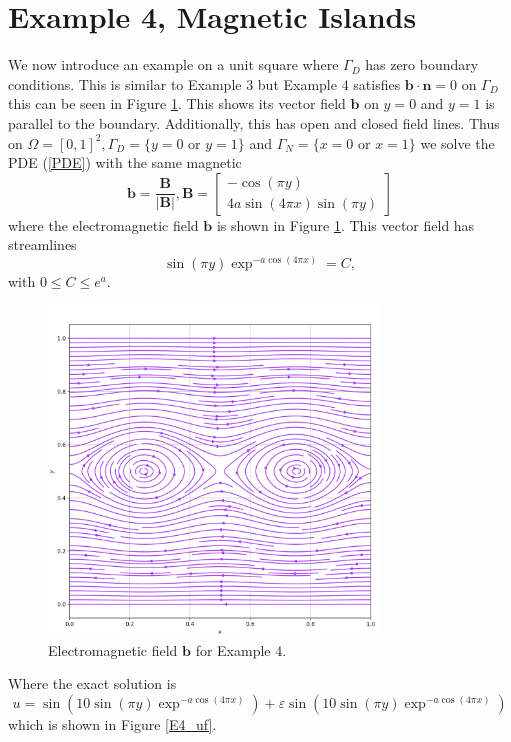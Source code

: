 \documentclass[12pt]{ociamthesis}
\begin{document}
\newpage
\section{Example 4, Magnetic Islands}

We now introduce an example on a unit square where $\Gamma_D$ has zero boundary conditions. This is similar to Example $3$ but Example $4$ satisfies $\mathbf{b}\cdot\mathbf{n} = 0$ on $\Gamma_D$ this can be seen in Figure \ref{E4_VF}. This shows its vector field $\mathbf{b}$ on $y=0$ and $y=1$ is parallel to the boundary. Additionally, this has open and closed field lines.
Thus on $\Omega = [0,1]^2, \Gamma_D = \{y=0 \text{ or } y=1\}$ and $\Gamma_N = \{x=0 \text{ or } x=1\}$ we solve the PDE (\ref{PDE}) with the same magnetic
\begin{equation}
\mathbf{b} = \frac{\mathbf{B}}{|\mathbf{B}|}, 
\mathbf{B} = \left[ \begin{matrix}
-\cos(\pi y)\\
4a \sin(4 \pi x) \sin(\pi y)
\end{matrix} \right]
\end{equation}
where the electromagnetic field $\mathbf{b}$ is shown in Figure \ref{E4_VF}. This vector field has streamlines 
\begin{equation}
\sin(\pi y)\exp^{-a\cos(4\pi x)} = C,
\end{equation}
with $0\leq C \leq e^a$.

\begin{figure}[H]
\begin{center}
 \includegraphics[width=0.78\textwidth]{Pics/VectorField/E4b.png}
  \caption{Electromagnetic field $\mathbf{b}$ for Example $4$.}
 \label{E4_VF}
\end{center}
\end{figure}
Where the exact solution is 
\begin{equation}
u = \sin(10 \sin(\pi y) \exp^{-a\cos(4 \pi x)})  + \varepsilon \sin(10 \sin(\pi y) \exp^{-a\cos(4 \pi x)})
\end{equation}
which is shown in Figure \ref{E4_uf}.
\end{document}
